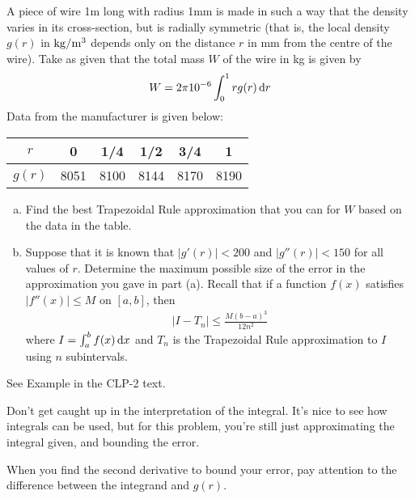 \begin{Mquestion}[2002A,M121 2002A]
A piece of wire 1m long with radius 1mm is made in such
a way that the density varies in its cross-section, but is radially symmetric
(that is, the local density $g(r)$ in ${\rm kg/m^3}$ depends only on the
distance $r$ in mm from the centre of the wire). Take as given that the
total mass $W$ of the wire in kg is given by
\begin{align*}
W=2\pi 10^{-6}\int_0^1 rg(r)\,\mathrm{d}r
\end{align*}
Data from the manufacturer is given below:

\renewcommand{\arraystretch}{1.1}
\begin{center}
     \begin{tabular}{|c|c|c|c|c|c|}
          \hline
          $r$ &0&1/4&1/2&3/4&1 \\
          \hline
          $g(r)$ &8051&8100&8144&8170&8190\\
          \hline
     \end{tabular}
\end{center}
\renewcommand{\arraystretch}{1.0}

\begin{enumerate}[(a)]
\item
Find the best Trapezoidal Rule approximation that you
can for $W$ based on the data in the table.
\item
Suppose that it is known that $|g'(r)|<200$ and
$|g''(r)|<150$ for all values of $r$. Determine the maximum possible size
of the error in the approximation you gave in part (a). Recall that if
a function $f(x)$ satisfies $|f''(x)|\le M$ on $[a,b]$, then
\begin{align*}
|I-T_n|\le\frac{M(b-a)^3}{12n^2}
\end{align*}
where $I=\int_a^b f(x)\,\mathrm{d}x$ and $T_n$ is the Trapezoidal Rule approximation
to $I$ using $n$ subintervals.
\end{enumerate}
\end{Mquestion}

\begin{hint}
See Example  in the
CLP-2 text.

Don't get caught up in the interpretation of the integral. It's nice to see how integrals can be used, but for this problem, you're still just approximating the integral given, and bounding the error.

When you find the second derivative to bound your error, pay attention to the difference between the integrand and $g(r)$.
\end{hint}

